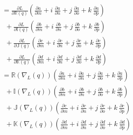 \begin{align}
&= \frac{\partial L}{\partial \mathbb{R}(q)} \left( \frac{\partial a}{\partial m} + \textit{i}~\frac{\partial a}{\partial n} + \textit{j}~\frac{\partial a}{\partial o} + \textit{k}~\frac{\partial a}{\partial p} \right) \\ \nonumber
&~~+ \frac{\partial L}{\partial \mathbb{I}(q)} \left( \frac{\partial b}{\partial m} + \textit{i}~\frac{\partial b}{\partial n} + \textit{j}~\frac{\partial b}{\partial o} + \textit{k}~\frac{\partial b}{\partial p} \right) \\ \nonumber
&~~+ \frac{\partial L}{\partial \mathbb{J}(q)} \left( \frac{\partial c}{\partial m} + \textit{i}~\frac{\partial c}{\partial n} + \textit{j}~\frac{\partial c}{\partial o} + \textit{k}~\frac{\partial c}{\partial p} \right) \\ \nonumber
&~~+ \frac{\partial L}{\partial \mathbb{K}(q)} \left( \frac{\partial d}{\partial m} + \textit{i}~\frac{\partial d}{\partial n} + \textit{j}~\frac{\partial d}{\partial o} + \textit{k}~\frac{\partial d}{\partial p} \right) \\ \nonumber
&= \mathbb{R}(\nabla_L(q)) \left( \frac{\partial a}{\partial m} + \textit{i}~\frac{\partial a}{\partial n} + \textit{j}~\frac{\partial a}{\partial o} + \textit{k}~\frac{\partial a}{\partial p} \right) \\ \nonumber
&~~+ \mathbb{I}(\nabla_L(q)) \left( \frac{\partial b}{\partial m} + \textit{i}~\frac{\partial b}{\partial n} + \textit{j}~\frac{\partial b}{\partial o} + \textit{k}~\frac{\partial b}{\partial p} \right) \\ \nonumber
&~~+ \mathbb{J}(\nabla_L(q)) \left( \frac{\partial c}{\partial m} + \textit{i}~\frac{\partial c}{\partial n} + \textit{j}~\frac{\partial c}{\partial o} + \textit{k}~\frac{\partial c}{\partial p} \right) \\ \nonumber
&~~+ \mathbb{K}(\nabla_L(q)) \left( \frac{\partial d}{\partial m} + \textit{i}~\frac{\partial d}{\partial n} + \textit{j}~\frac{\partial d}{\partial o} + \textit{k}~\frac{\partial d}{\partial p} \right)
\label{eq:diff2}
\end{align}


